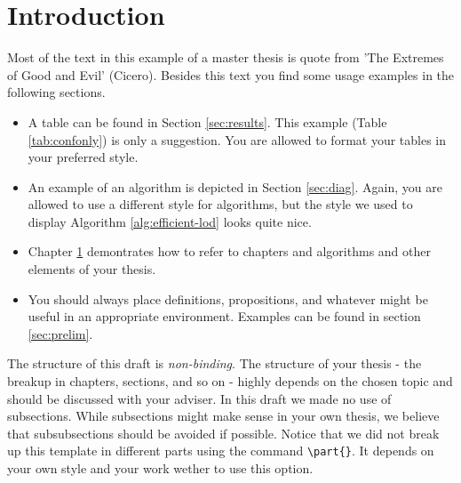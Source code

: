
\chapter{Introduction}
\label{cha:intro}

Most of the text in this example of a master thesis is quote from 'The Extremes of Good and Evil' (Cicero). Besides this text you find some usage examples in the following sections.

\begin{itemize}
	\item A table can be found in Section \ref{sec:results}. This example (Table \ref{tab:confonly}) is only a suggestion. You are allowed to format your tables in your preferred style.
	\item An example of an algorithm is depicted in Section \ref{sec:diag}. Again, you are allowed to use a different style for algorithms, but the style we used to display Algorithm \ref{alg:efficient-lod} looks quite nice.
	\item Chapter \ref{cha:intro} demontrates how to refer to chapters and algorithms and other elements of your thesis.
	\item You should always place definitions, propositions, and whatever might be useful in an appropriate environment.  Examples can be found in section \ref{sec:prelim}.
\end{itemize}

The structure of this draft is \emph{non-binding}. The structure of your thesis - the breakup in chapters, sections, and so on - highly depends on the chosen topic and should be discussed with your adviser. In this draft we made no use of subsections. While subsections might make sense in your own thesis, we believe that subsubsections should be avoided if possible. Notice that we did not break up this template in different parts using the command \verb|\part{}|. It depends on your own style and your work wether to use this option.

